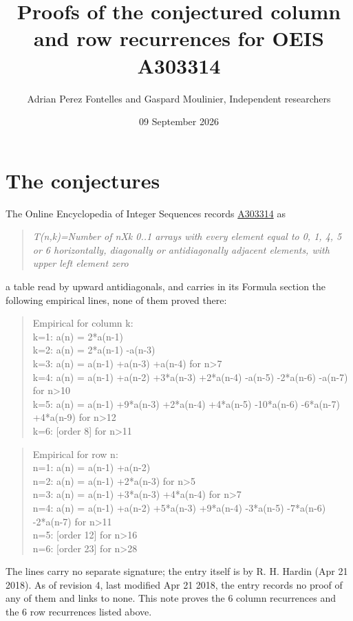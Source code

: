 \documentclass[11pt]{article}
\title{Proofs of the conjectured column and row recurrences for OEIS A303314}
\author{Adrian Perez Fontelles and Gaspard Moulinier, Independent researchers}
\date{09 September 2026}
\theoremstyle{definition}
\begin{document}
\maketitle
\section{The conjectures}

The Online Encyclopedia of Integer Sequences records \href{https://oeis.org/A303314}{A303314} as

\begin{quote}\itshape T(n,k)=Number of nXk 0..1 arrays with every element equal to 0, 1, 4, 5 or 6 horizontally, diagonally or antidiagonally adjacent elements, with upper left element zero\end{quote}

a table read by upward antidiagonals, and carries in its Formula section the following empirical lines, none of them proved there:

\begin{quote}\ttfamily Empirical for column k:\\
k=1: a(n) = 2*a(n-1)\\k=2: a(n) = 2*a(n-1) -a(n-3)\\k=3: a(n) = a(n-1) +a(n-3) +a(n-4) for n>7\\k=4: a(n) = a(n-1) +a(n-2) +3*a(n-3) +2*a(n-4) -a(n-5) -2*a(n-6) -a(n-7) for n>10\\k=5: a(n) = a(n-1) +9*a(n-3) +2*a(n-4) +4*a(n-5) -10*a(n-6) -6*a(n-7) +4*a(n-9) for n>12\\k=6: [order 8] for n>11\end{quote}

\begin{quote}\ttfamily Empirical for row n:\\
n=1: a(n) = a(n-1) +a(n-2)\\n=2: a(n) = a(n-1) +2*a(n-3) for n>5\\n=3: a(n) = a(n-1) +3*a(n-3) +4*a(n-4) for n>7\\n=4: a(n) = a(n-1) +a(n-2) +5*a(n-3) +9*a(n-4) -3*a(n-5) -7*a(n-6) -2*a(n-7) for n>11\\n=5: [order 12] for n>16\\n=6: [order 23] for n>28\end{quote}

The lines carry no separate signature; the entry itself is by R. H. Hardin (Apr 21 2018). As of revision 4, last modified Apr 21 2018, the entry records no proof of any of them and links to none. This note proves the 6 column recurrences and the 6 row recurrences listed above.
\end{document}
